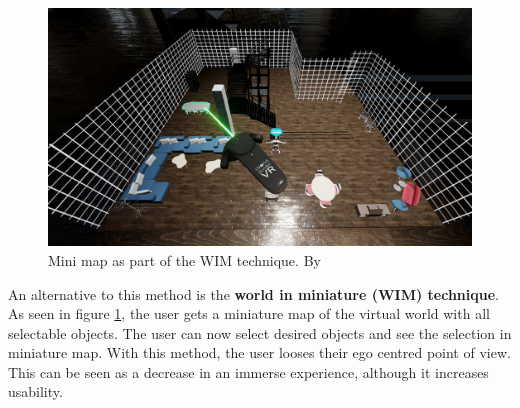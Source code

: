 \begin{figure}[h!]
  \includegraphics[width=14cm]{kapitel/eps/mini-map.pdf}
  \centering
  \caption{Mini map as part of the WIM technique. By \cite{Arnowitz.2017}}
  \label{fig:minimap}
\end{figure}
An alternative to this method is the \textbf{world in miniature (WIM) technique}. As seen in figure \ref{fig:minimap}, the user gets a miniature map of the virtual world with all selectable objects. The user can now select desired objects and see the selection in miniature map. With this method, the user looses their ego centred point of view. This can be seen as a decrease in an immerse experience, although it increases usability.

